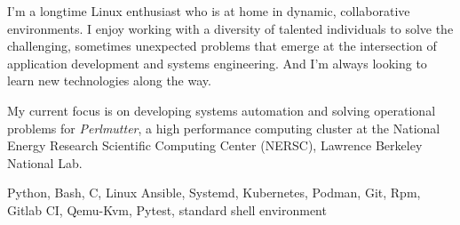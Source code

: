 
\begin{cvparagraph}

  I'm a longtime Linux enthusiast who is at home in dynamic, collaborative environments.
  I enjoy working with a diversity of talented individuals to solve the challenging, sometimes unexpected problems that emerge at the intersection of application development and systems engineering.
  And I'm always looking to learn new technologies along the way.

  My current focus is on developing systems automation and solving operational problems for \textit{Perlmutter}, a high performance computing cluster at the National Energy Research Scientific Computing Center (NERSC), Lawrence Berkeley National Lab.  


\begin{cvbox}
\begin{cvskills}
   {Python, Bash, C, Linux}
   {Ansible, Systemd, Kubernetes, Podman, Git, Rpm, Gitlab CI, Qemu-Kvm, Pytest, standard shell environment}
\end{cvskills}
\end{cvbox}

\end{cvparagraph}

